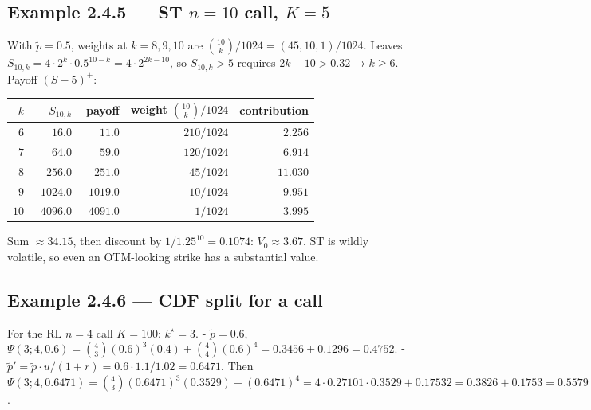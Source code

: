 \documentclass[
  10pt,
  twoside]{book}
\newcounter{none} %
\begin{document}
\subsection{\texorpdfstring{Example 2.4.5 --- ST \(n=10\) call,
\(K=5\)}{Example 2.4.5 --- ST n=10 call, K=5}}\label{example-2.4.5-st-n10-call-k5}

With \(\tilde p=0.5\), weights at \(k=8,9,10\) are
\(\binom{10}{k}/1024 = (45, 10, 1)/1024\). Leaves
\(S_{10,k}=4\cdot 2^k\cdot 0.5^{10-k}=4\cdot 2^{2k-10}\), so
\(S_{10,k}>5\) requires \(2k-10>0.32\) → \(k\ge 6\). Payoff \((S-5)^+\):

{\def\LTcaptype{none} %
\begin{table}[H]
\centering
\begin{tabular}{|r|r|r|r|r|}
\toprule
\(k\) & \(S_{10,k}\) & payoff & weight \(\binom{10}{k}/1024\) & contribution \\
\midrule



\(\phantom{0}6\) & \(\phantom{000}16.0\) & \(\phantom{000}11.0\) &
\(210/1024\) & \(\phantom{0}2.256\) \\
\(\phantom{0}7\) & \(\phantom{000}64.0\) & \(\phantom{000}59.0\) &
\(120/1024\) & \(\phantom{0}6.914\) \\
\(\phantom{0}8\) & \(\phantom{00}256.0\) & \(\phantom{00}251.0\) &
\(\phantom{0}45/1024\) & \(11.030\) \\
\(\phantom{0}9\) & \(\phantom{0}1024.0\) & \(\phantom{0}1019.0\) &
\(\phantom{0}10/1024\) & \(\phantom{0}9.951\) \\
\(10\) & \(4096.0\) & \(4091.0\) & \(\phantom{00}1/1024\) &
\(\phantom{0}3.995\) \\
\bottomrule
\end{tabular}
\end{table}
}

Sum \(\approx 34.15\), then discount by \(1/1.25^{10}=0.1074\):
\(V_0\approx 3.67\). ST is wildly volatile, so even an OTM-looking
strike has a substantial value.

\subsection{Example 2.4.6 --- CDF split for a
call}\label{example-2.4.6-cdf-split-for-a-call}

For the RL \(n=4\) call \(K=100\): \(k^\star=3\). - \(\tilde p = 0.6\),
\(\Psi(3;4,0.6)=\binom{4}{3}(0.6)^3(0.4)+\binom{4}{4}(0.6)^4 = 0.3456+0.1296=0.4752\).
- \(\tilde p' = \tilde p\cdot u/(1+r) = 0.6\cdot 1.1/1.02 = 0.6471\).
Then
\(\Psi(3;4,0.6471) = \binom{4}{3}(0.6471)^3(0.3529)+(0.6471)^4 = 4\cdot 0.27101\cdot 0.3529 + 0.17532 = 0.3826+0.1753 = 0.5579\).
\end{document}
